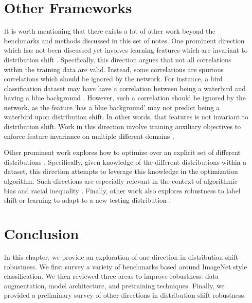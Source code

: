 \documentclass{article}
\begin{document}
\section{Other Frameworks}
It is worth mentioning that there exists a lot of other work beyond the benchmarks and methods discussed in this set of notes. One prominent direction which has not been discussed yet involves learning features which are invariant to distribution shift \cite{arjovsky2020invariant, shi2021gradient, sun2016deep}. Specifically, this direction argues that not all correlations within the training data are valid. Instead, some correlations are spurious correlations which should be ignored by the network. For instance, a bird classification dataset may have have a correlation between being a waterbird and having a blue background \cite{sagawa2020distributionally}. However, such a correlation should be ignored by the network, as the feature `has a blue background' may not predict being a waterbird upon distribution shift. In other words, that features is not invariant to distribution shift. Work in this direction involve training auxiliary objectives to enforce feature invariance on multiple different domains \cite{arjovsky2020invariant, shi2021gradient, sun2016deep}. 

Other prominent work explores how to optimize over an explicit set of different distributions \cite{sagawa2020distributionally, subbaswamy2021evaluating}. Specifically, given knowledge of the different distributions within a dataset, this direction attempts to leverage this knowledge in the optimization algorithm. Such directions are especially relevant in the context of algorithmic bias and racial inequality \cite{buolamwini2018gender}. Finally, other work also explores robustness to label shift \cite{lipton2018detecting} or learning to adapt to a new testing distribution \cite{wang2021tent}.

\section{Conclusion}

In this chapter, we provide an exploration of one direction in distribution shift robustness. We first survey a variety of benchmarks based around ImageNet style classification. We then reviewed three areas to improve robustness: data augmentation, model architecture, and pretraining techniques. Finally, we provided a preliminary survey of other directions in distribution shift robustness.
\end{document}
